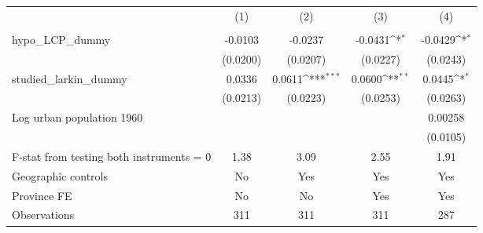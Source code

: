 {
\def\sym#1{\ifmmode^{#1}\else\(^{#1}\)\fi}
\begin{tabular}{l*{4}{c}}
\hline\hline
                &\multicolumn{1}{c}{(1)}&\multicolumn{1}{c}{(2)}&\multicolumn{1}{c}{(3)}&\multicolumn{1}{c}{(4)}\\
                &\multicolumn{1}{c}{}&\multicolumn{1}{c}{}&\multicolumn{1}{c}{}&\multicolumn{1}{c}{}\\
\hline
hypo\_LCP\_dummy  &  -0.0103         &  -0.0237         &  -0.0431\sym{*}  &  -0.0429\sym{*}  \\
                & (0.0200)         & (0.0207)         & (0.0227)         & (0.0243)         \\
[1em]
studied\_larkin\_dummy&   0.0336         &   0.0611\sym{***}&   0.0600\sym{**} &   0.0445\sym{*}  \\
                & (0.0213)         & (0.0223)         & (0.0253)         & (0.0263)         \\
[1em]
Log urban population 1960&                  &                  &                  &  0.00258         \\
                &                  &                  &                  & (0.0105)         \\
\hline
F-stat from testing both instruments = 0&     1.38         &     3.09         &     2.55         &     1.91         \\
Geographic controls&       No         &      Yes         &      Yes         &      Yes         \\
Province FE     &       No         &       No         &      Yes         &      Yes         \\
Observations    &      311         &      311         &      311         &      287         \\
\hline\hline
\end{tabular}
}
